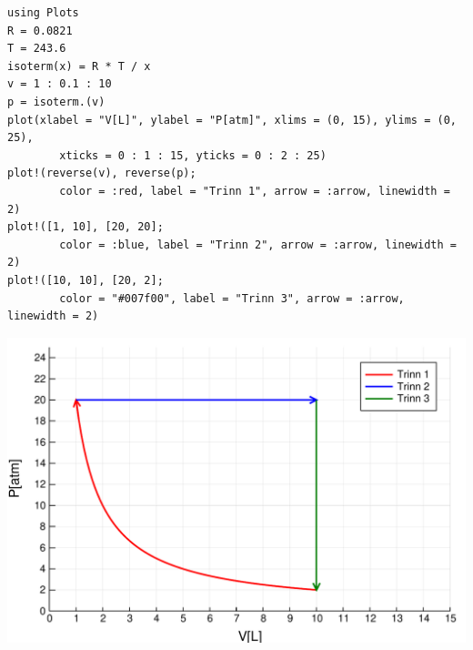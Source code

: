 \begin{verbatim}
using Plots
R = 0.0821
T = 243.6
isoterm(x) = R * T / x
v = 1 : 0.1 : 10
p = isoterm.(v)
plot(xlabel = "V[L]", ylabel = "P[atm]", xlims = (0, 15), ylims = (0, 25),
		xticks = 0 : 1 : 15, yticks = 0 : 2 : 25)
plot!(reverse(v), reverse(p);
		color = :red, label = "Trinn 1", arrow = :arrow, linewidth = 2)
plot!([1, 10], [20, 20];
		color = :blue, label = "Trinn 2", arrow = :arrow, linewidth = 2)
plot!([10, 10], [20, 2];
		color = "#007f00", label = "Trinn 3", arrow = :arrow, linewidth = 2)
\end{verbatim}
\includegraphics[width=\linewidth]{figures/oppg_1_1.pdf}
